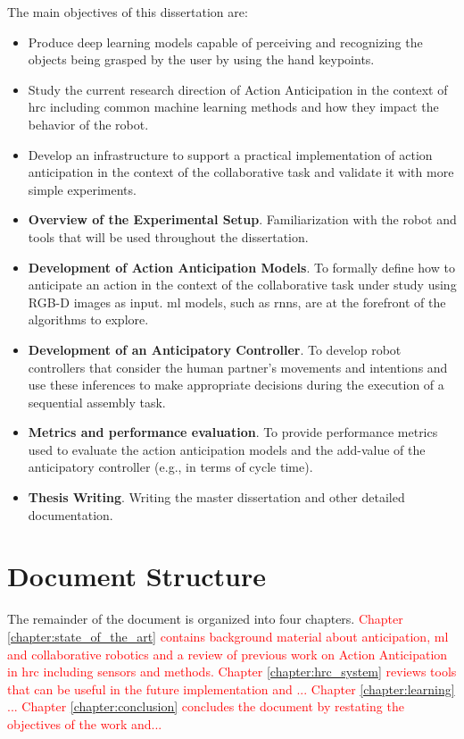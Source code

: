 The main objectives of this dissertation are:
\begin{itemize}
    \item Produce deep learning models capable of perceiving and recognizing the objects being grasped by the user by using the hand keypoints.
    
    \item Study the current research direction of Action Anticipation in the context of \acl{hrc} including common machine learning methods and how they impact the behavior of the robot.

    \item Develop an infrastructure to support a practical implementation of action anticipation in the context of the collaborative task and validate it with more simple experiments.

    \item \textbf{Overview of the Experimental Setup}. Familiarization with the robot and tools that will be used throughout the dissertation.

    \item \textbf{Development of Action Anticipation Models}. To formally define how to anticipate an action in the context of the collaborative task under study using RGB-D images as input. \acs{ml} models, such as \acfp{rnn}, are at the forefront of the algorithms to explore.
    
    \item \textbf{Development of an Anticipatory Controller}. To develop robot controllers that consider the human partner's movements and intentions and use these inferences to make appropriate decisions during the execution of a sequential assembly task.

    \item \textbf{Metrics and performance evaluation}. To provide performance metrics used to evaluate the action anticipation models and the add-value of the anticipatory controller (e.g., in terms of cycle time).
    
    \item \textbf{Thesis Writing}. Writing the master dissertation and other detailed documentation.
    \fi
\end{itemize}

\section{Document Structure}

The remainder of the document is organized into four chapters. \textcolor{red}{Chapter \ref{chapter:state_of_the_art} contains background material about anticipation, \acl{ml} and collaborative robotics and a review of previous work on Action Anticipation in \acs{hrc} including sensors and methods. Chapter \ref{chapter:hrc_system} reviews tools that can be useful in the future implementation and ... Chapter \ref{chapter:learning} ... Chapter \ref{chapter:conclusion} concludes the document by restating the objectives of the work and...}
